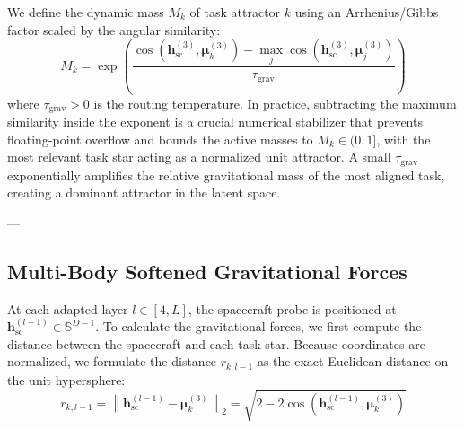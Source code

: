 We define the dynamic mass $M_k$ of task attractor $k$ using an Arrhenius/Gibbs factor scaled by the angular similarity:
\vspace{-3pt}
\begin{equation}
    M_k = \exp\left( \frac{\cos(\mathbf{h}_{\text{sc}}^{(3)}, \boldsymbol{\mu}_k^{(3)}) - \max_j \cos(\mathbf{h}_{\text{sc}}^{(3)}, \boldsymbol{\mu}_j^{(3)})}{\tau_{\text{grav}}} \right)
    \label{eq:ama}
\end{equation}
\vspace{-3pt}
where $\tau_{\text{grav}} > 0$ is the routing temperature. In practice, subtracting the maximum similarity inside the exponent is a crucial numerical stabilizer that prevents floating-point overflow and bounds the active masses to $M_k \in (0, 1]$, with the most relevant task star acting as a normalized unit attractor. A small $\tau_{\text{grav}}$ exponentially amplifies the relative gravitational mass of the most aligned task, creating a dominant attractor in the latent space.

---

\vspace{-5pt}
\subsection{Multi-Body Softened Gravitational Forces}
At each adapted layer $l \in [4, L]$, the spacecraft probe is positioned at $\mathbf{h}_{\text{sc}}^{(l-1)} \in \mathbb{S}^{D-1}$. To calculate the gravitational forces, we first compute the distance between the spacecraft and each task star. Because coordinates are normalized, we formulate the distance $r_{k, l-1}$ as the exact Euclidean distance on the unit hypersphere:
\vspace{-3pt}
\begin{equation}
    r_{k, l-1} = \left\| \mathbf{h}_{\text{sc}}^{(l-1)} - \boldsymbol{\mu}_k^{(3)} \right\|_2 = \sqrt{2 - 2\cos(\mathbf{h}_{\text{sc}}^{(l-1)}, \boldsymbol{\mu}_k^{(3)})}
    \label{eq:distance}
\end{equation}
\vspace{-3pt}


